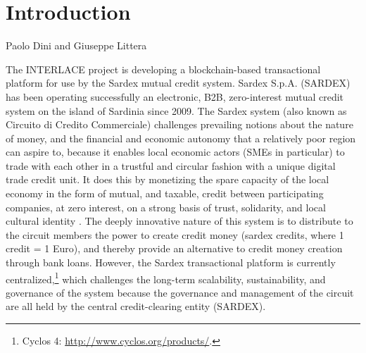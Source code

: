 \chapter{Introduction}
\label{ch:Introduction}

\vspace{-1cm}
\begin{center}
Paolo Dini and Giuseppe Littera
\end{center}

The INTERLACE project is developing a blockchain-based transactional platform for use by the Sardex mutual credit system. Sardex S.p.A. (SARDEX) has been operating successfully an electronic, B2B, zero-interest mutual credit system on the island of Sardinia since 2009. The Sardex system (also known as Circuito di Credito Commerciale) challenges prevailing notions about the nature of money, and the financial and economic autonomy that a relatively poor region can aspire to, because it enables local economic actors (SMEs in particular) to trade with each other in a trustful and circular fashion with a unique digital trade credit unit. It does this by monetizing the spare capacity of the local economy in the form of mutual, and taxable, credit between participating companies, at zero interest, on a strong basis of trust, solidarity, and local cultural identity \cite{LitteraEtAl2017,DiniMottaSartori2016,SartoriDini2016}. The deeply innovative nature of this system is to distribute to the circuit members the power to create credit money (sardex credits, where 1 credit = 1 Euro), and thereby provide an alternative to credit money creation through bank loans. However, the Sardex transactional platform is currently centralized,\footnote{Cyclos 4: \url{http://www.cyclos.org/products/}.} which challenges the long-term scalability, sustainability, and governance of the system because the governance and management of the circuit are all held by the central credit-clearing entity (SARDEX).

